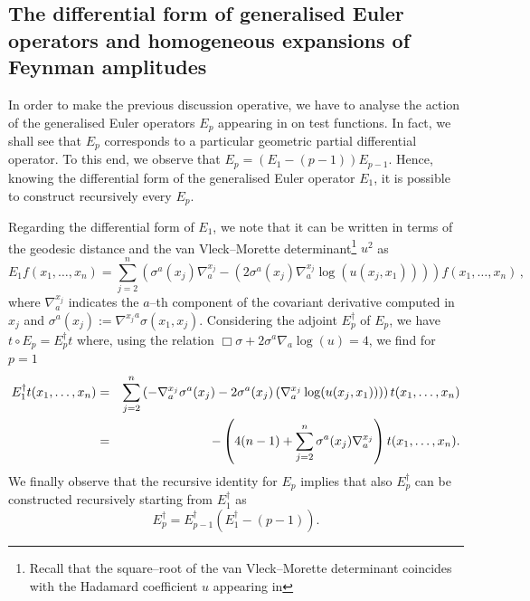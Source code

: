 \documentclass[10pt]{book}
\theoremstyle{break}
\begin{document}
\subsection{The differential form of generalised Euler operators and homogeneous expansions of Feynman amplitudes}


In order to make the previous discussion operative, we have to analyse the action of the generalised Euler operators $E_p$ appearing in %
on test functions. In fact, we shall see that $E_p$ corresponds to a particular geometric partial differential operator. To this end, we observe that $E_p = (E_1-(p-1)) E_{p-1}$. Hence, knowing the differential form of the generalised Euler operator $E_1$, it is possible to construct recursively every $E_p$.

Regarding the differential form of $E_1$, we note that it can be written in terms of the geodesic distance and the van Vleck--Morette determinant\footnote{Recall that the square--root of the van Vleck--Morette determinant coincides with the Hadamard coefficient $u$ appearing in %
} 
$u^2$  as 
\[
E_1 f(x_1, \dots, x_n) = \sum_{j=2}^n \left(\sigma^a(x_j) \nabla^{x_j}_a  - \left(2  \sigma^a(x_j) \nabla^{x_j}_a  \log (u(x_j,x_1))\right)\right) f(x_1, \dots, x_n)\,,
\]
where $\nabla^{x_j}_a$ indicates the $a$--th component of the covariant derivative computed in $x_j$ and 
$\sigma^a(x_j) := {\nabla^{x_j}}^a\sigma(x_1,x_j)$.
Considering the adjoint $E^\dagger_p$ of $E_p$, we have $t\circ E_p = E^\dagger_p t$ where, using the relation $\Box \sigma + 2\sigma^a\nabla_a \log (u) = 4$, we find for $p=1$
%
\begin{eqnarray}
E_1^\dagger  t(x_1,\dots,x_n)     
&=&  \sum_{j=2}^n \left(- \nabla^{x_j}_a \sigma^a(x_j)    - 2 \sigma^a(x_j) \left(\nabla^{x_j}_a \log (u(x_j,x_1)) \right)\right) t(x_1,\dots,x_n) \notag \\
&=& -\left( 4(n-1) +  \sum_{j=2}^n \sigma^a(x_j) \nabla^{x_j}_a   \right)t(x_1,\dots,x_n).
\end{eqnarray}
%
We finally observe that the recursive identity for $E_p$ implies that also $E^\dagger_p$ can be constructed recursively starting from $E^\dagger_1$ as 
\[
E_p^\dagger =  E_{p-1}^\dagger (E_1^\dagger-(p-1)).
\]
\end{document}
